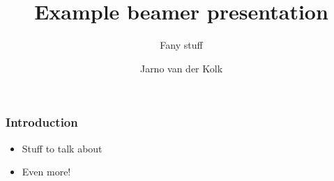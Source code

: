 \documentclass[11pt]{beamer}
\begin{document}
	\author{Jarno van der Kolk}
	\title{Example beamer presentation}
	\subtitle{Fany stuff}
	\begin{frame}[plain]
		\maketitle
	\end{frame}
	
	\begin{frame}
		\frametitle{Introduction}
		
		\begin{itemize}
			\item Stuff to talk about
			\item Even more!
		\end{itemize}
	\end{frame}
\end{document}
